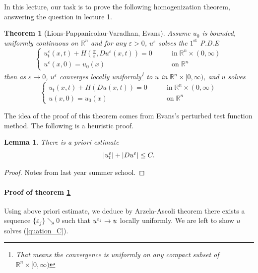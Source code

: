 \documentclass[12pt, oneside]{amsart}  	%
\newtheorem{theorem}{Theorem}
\newtheorem{lemma}{Lemma}
\begin{document}
In this lecture, our task is to prove the following homogenization theorem, answering the question in lecture 1.

\begin{theorem}[Lions-Pappanicolau-Varadhan, Evans] \label{theorem2} Assume $u_0$ is bounded, uniformly continuous on $\mathbb{R}^n$ and for any $\varepsilon>0$, $u^\varepsilon$ solves the $1^{\text{st}}$ P.D.E
\begin{equation}\label{quation_C_varepsilon}
\begin{cases}
u_t^\varepsilon(x,t) + H\left(\frac{x}{\varepsilon}, Du^\varepsilon(x,t)\right)  = 0 &\qquad\text{in}\;\mathbb{R}^n\times(0,\infty) \\
u^\varepsilon(x,0) = u_0(x) &\qquad\text{on}\;\mathbb{R}^n
\end{cases} \tag{$C_\varepsilon$}
\end{equation}
then as $\varepsilon\longrightarrow 0$, $u^\varepsilon$ converges locally uniformly\footnote{That means the convergence is uniformly on any compact subset of $\mathbb{R}^n\times [0,\infty)$} to $u$ in $\mathbb{R}^n\times [0,\infty)$, and $u$ solves
\begin{equation}\label{quation_C}
\begin{cases}
u_t(x,t) + \overline{H}\left(Du(x,t)\right)  = 0 &\qquad\text{in}\;\mathbb{R}^n\times(0,\infty) \\
u(x,0) = u_0(x) &\qquad\text{on}\;\mathbb{R}^n
\end{cases} \tag{$C$}
\end{equation}
\end{theorem}
The idea of the proof of this theorem comes from Evans's perturbed test function method. The following is a heuristic proof.

\begin{lemma}
	There is a priori estimate $$|u^\varepsilon_t|+|Du^\varepsilon| \le C.$$
\end{lemma}
\begin{proof} Notes from last year summer school.
\end{proof}

\paragraph{\textbf{Proof of theorem} \ref{theorem2}} Using above priori estimate, we deduce by Arzela-Ascoli theorem there exists a sequence $\{\varepsilon_j\} \searrow 0$ such that $u^{\varepsilon_j}\to u$ locally uniformly. We are left to show $u$ solves (\ref{quation_C}).\\
\end{document}
